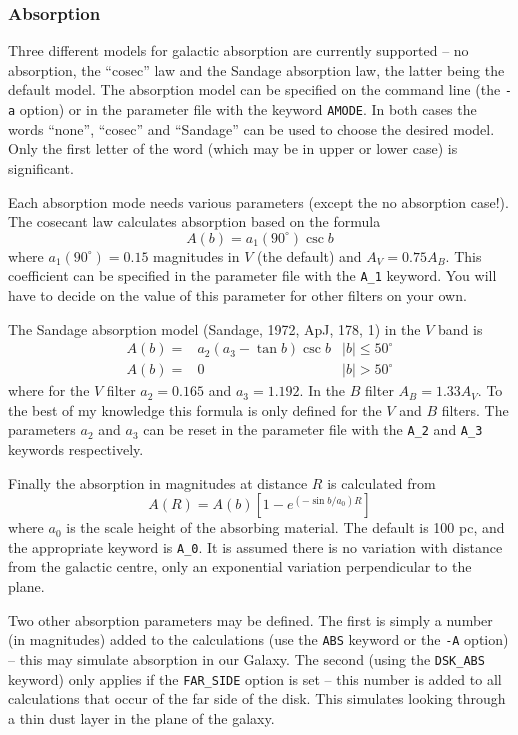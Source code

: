 \subsubsection*{Absorption}

Three different models for galactic absorption are currently supported -- no
absorption, the ``cosec'' law and the Sandage absorption law, the latter being
the default model. The absorption model can be specified on the command line
(the {\tt -a} option) or in the parameter file with the keyword {\tt AMODE}. 
In both cases the words ``none'', ``cosec'' and ``Sandage'' can be used to 
choose the desired model. Only the first letter of the word (which may be 
in upper or lower case) is significant.

Each absorption mode needs various parameters (except the no absorption
case!). The cosecant law calculates absorption based on the formula
\[
A(b) = a_1(90^\circ) \csc b
\]
where $a_1(90^\circ) = 0.15$ magnitudes in $V$ (the default) and 
$A_V = 0.75 A_B$. This coefficient can be specified in the parameter file
with the {\tt A\_1} keyword. You will have to decide on the value of this 
parameter for other filters on your own.

The Sandage absorption model (Sandage, 1972, ApJ, 178, 1) in the $V$ band is
\[
\begin{array}{lll}
A(b) = & a_2 ( a_3 - \tan b) \csc b & |b| \leq 50^\circ \\
A(b) = & 0 & |b| > 50^\circ
\end{array}
\]
where for the $V$ filter $a_2 = 0.165$ and $a_3 = 1.192$. In the $B$ filter
$A_B = 1.33 A_V$. To the best of my knowledge this formula is only defined
for the $V$ and $B$ filters. The parameters $a_2$ and $a_3$ can be 
reset in the parameter file with the {\tt A\_2} and {\tt A\_3} keywords 
respectively.

Finally the absorption in magnitudes at distance $R$ is calculated from
\[
A(R) = A(b) \left[ 1 - e^{(- \sin b / a_0) R} \right]
\]
where $a_0$ is the scale height of the absorbing material. The default is
100 pc, and the appropriate keyword is {\tt A\_0}. It is assumed there is no
variation with distance from the galactic centre, only an exponential
variation perpendicular to the plane.

Two other absorption parameters may be defined. The first is simply a 
number (in magnitudes) added to the calculations (use the {\tt ABS} keyword 
or the {\tt -A} option) -- this may simulate absorption in our Galaxy. The
second (using the {\tt DSK\_ABS} keyword) only applies if the {\tt FAR\_SIDE} 
option is set -- this number is added to all calculations that occur of the 
far side of the disk. This simulates looking through a thin dust layer in the 
plane of the galaxy.

